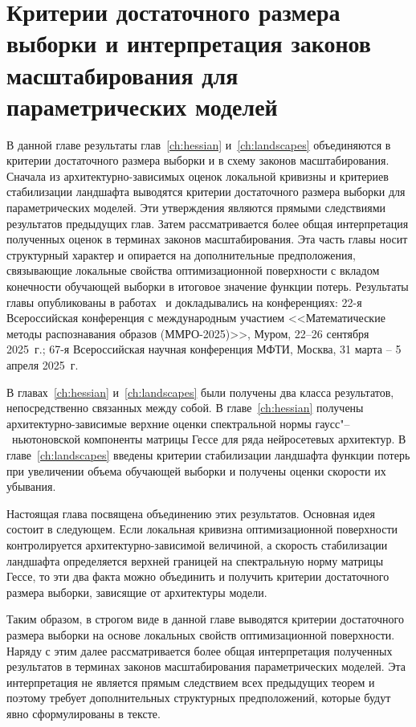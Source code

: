 \chapter{Критерии достаточного размера выборки и интерпретация законов масштабирования для параметрических моделей}\label{ch:scaling-laws}

В данной главе результаты глав~\ref{ch:hessian} и~\ref{ch:landscapes} объединяются в критерии достаточного размера выборки и в схему законов масштабирования. Сначала из архитектурно-зависимых оценок локальной кривизны и критериев стабилизации ландшафта выводятся критерии достаточного размера выборки для параметрических моделей. Эти утверждения являются прямыми следствиями результатов предыдущих глав. Затем рассматривается более общая интерпретация полученных оценок в терминах законов масштабирования. Эта часть главы носит структурный характер и опирается на дополнительные предположения, связывающие локальные свойства оптимизационной поверхности с вкладом конечности обучающей выборки в итоговое значение функции потерь. Результаты главы опубликованы в работах~\cite{kiselev2025mmro,kiselev2025conf67mipt} и докладывались на конференциях: 22-я Всероссийская конференция с международным участием <<Математические методы распознавания образов (ММРО-2025)>>, Муром, 22--26 сентября 2025~г.; 67-я Всероссийская научная конференция МФТИ, Москва, 31 марта -- 5 апреля 2025~г.


В главах~\ref{ch:hessian} и~\ref{ch:landscapes} были получены два класса результатов, непосредственно связанных между собой. В главе~\ref{ch:hessian} получены архитектурно-зависимые верхние оценки спектральной нормы гаусс"--~ньютоновской компоненты матрицы Гессе для ряда нейросетевых архитектур. В главе~\ref{ch:landscapes} введены критерии стабилизации ландшафта функции потерь при увеличении объема обучающей выборки и получены оценки скорости их убывания.

Настоящая глава посвящена объединению этих результатов. Основная идея состоит в следующем. Если локальная кривизна оптимизационной поверхности контролируется архитектурно-зависимой величиной, а скорость стабилизации ландшафта определяется верхней границей на спектральную норму матрицы Гессе, то эти два факта можно объединить и получить критерии достаточного размера выборки, зависящие от архитектуры модели.

Таким образом, в строгом виде в данной главе выводятся критерии достаточного размера выборки на основе локальных свойств оптимизационной поверхности. Наряду с этим далее рассматривается более общая интерпретация полученных результатов в терминах законов масштабирования параметрических моделей. Эта интерпретация не является прямым следствием всех предыдущих теорем и поэтому требует дополнительных структурных предположений, которые будут явно сформулированы в тексте.

